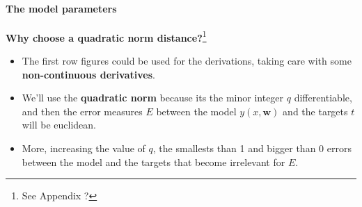 \begin{frame}{\insertsubsection}
	\framesubtitle{The model parameters}
	\textcolor{UniGold}{\textbf{Why choose a quadratic norm distance?}}\footnote{See Appendix ?}
	\begin{itemize}
		\item The first row figures could be used for the derivations, taking care with some \textcolor{UniOrange}{\textbf{non-continuous derivatives}}.
		\item We'll use the \textcolor{UniOrange}{\textbf{quadratic norm}} because its the minor integer $q$ differentiable, and then the error measures $E$ between the model $y(x,\mathbf{w})$ and the targets $t$ will be euclidean.
		\item More, increasing the value of $q$, the smallests than 1 and bigger than 0 errors between the model and the targets that become irrelevant for $E$.
	\end{itemize}
\end{frame}

